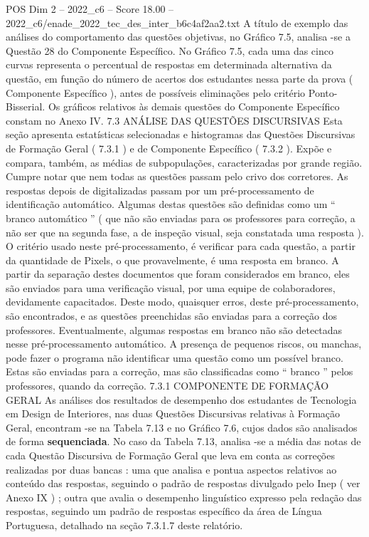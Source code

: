 \begin{textsample}{POS Dim 2 – 2022\_c6 – Score 18.00 – 2022\_c6/enade\_2022\_tec\_des\_inter\_b6c4af2aa2.txt}
A título de exemplo das análises do comportamento das questões objetivas, no Gráfico 7.5, analisa -se a Questão 28 do Componente Específico.
No Gráfico 7.5, cada uma das cinco curvas representa o percentual de respostas em determinada alternativa da questão, em função do número de acertos dos estudantes nessa parte da prova ( Componente Específico ), antes de possíveis eliminações pelo critério Ponto-Bisserial.
Os gráficos relativos às demais questões do Componente Específico constam no Anexo IV. 7.3 ANÁLISE DAS QUESTÕES DISCURSIVAS Esta seção apresenta estatísticas selecionadas e histogramas das Questões Discursivas de Formação Geral ( 7.3.1 ) e de Componente Específico ( 7.3.2 ).
Expõe e compara, também, as médias de subpopulações, caracterizadas por grande região.
Cumpre notar que nem todas as questões passam pelo crivo dos corretores.
As respostas depois de digitalizadas passam por um pré-processamento de identificação automático.
Algumas destas questões são definidas como um “ branco automático ” ( que não são enviadas para os professores para correção, a não ser que na segunda fase, a de inspeção visual, seja constatada uma resposta ).
O critério usado neste pré-processamento, é verificar para cada questão, a partir da quantidade de Pixels, o que provavelmente, é uma resposta em branco.
A partir da separação destes documentos que foram considerados em branco, eles são enviados para uma verificação visual, por uma equipe de colaboradores, devidamente capacitados.
Deste modo, quaisquer erros, deste pré-processamento, são encontrados, e as questões preenchidas são enviadas para a correção dos professores.
Eventualmente, algumas respostas em branco não são detectadas nesse pré-processamento automático.
A presença de pequenos riscos, ou manchas, pode fazer o programa não identificar uma questão como um possível branco.
Estas são enviadas para a correção, mas são classificadas como “ branco ” pelos professores, quando da correção. 7.3.1 COMPONENTE DE FORMAÇÃO GERAL As análises dos resultados de desempenho dos estudantes de Tecnologia em Design de Interiores, nas duas Questões Discursivas relativas à Formação Geral, encontram -se na Tabela 7.13 e no Gráfico 7.6, cujos dados são analisados de forma \textbf{sequenciada}.
No caso da Tabela 7.13, analisa -se a média das notas de cada Questão Discursiva de Formação Geral que leva em conta as correções realizadas por duas bancas : uma que analisa e pontua aspectos relativos ao conteúdo das respostas, seguindo o padrão de respostas divulgado pelo Inep ( ver Anexo IX ) ; outra que avalia o desempenho linguístico expresso pela redação das respostas, seguindo um padrão de respostas específico da área de Língua Portuguesa, detalhado na seção 7.3.1.7 deste relatório.

\end{textsample}
